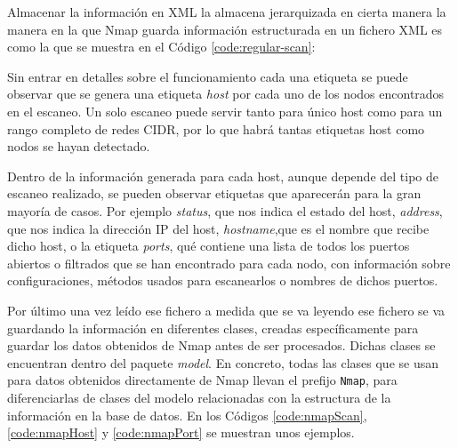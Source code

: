 Almacenar la información en XML la almacena jerarquizada en cierta manera la manera en la que Nmap guarda información estructurada en un fichero XML es como la que se muestra en el Código \ref{code:regular-scan}:


Sin entrar en detalles sobre el funcionamiento cada una etiqueta se puede observar que se genera una etiqueta \textit{host} por cada uno de los nodos encontrados en el escaneo. Un solo escaneo puede servir tanto para único host como para un rango completo de redes CIDR, por lo que habrá tantas etiquetas host como nodos se hayan detectado.

Dentro de la información generada para cada host, aunque depende del tipo de escaneo realizado, se pueden observar etiquetas que aparecerán para la gran mayoría de casos. Por ejemplo \textit{status}, que nos indica el estado del host, \textit{address}, que nos indica la dirección IP del host, \textit{hostname},que es el nombre que recibe dicho host, o la etiqueta \textit{ports}, qué contiene una lista de todos los puertos abiertos o filtrados que se han encontrado para cada nodo, con información sobre configuraciones, métodos usados para escanearlos o nombres de dichos puertos.

Por último una vez leído ese fichero a medida que se va leyendo ese fichero se va guardando la información en diferentes clases, creadas específicamente para guardar los datos obtenidos de Nmap antes de ser procesados. Dichas clases se encuentran dentro del paquete \textit{model}. En concreto, todas las clases que se usan para datos obtenidos directamente de Nmap llevan el prefijo \texttt{Nmap}, para diferenciarlas de clases del modelo relacionadas con la estructura de la información en la base de datos. En los Códigos \ref{code:nmapScan}, \ref{code:nmapHost} y \ref{code:nmapPort} se muestran unos ejemplos.


